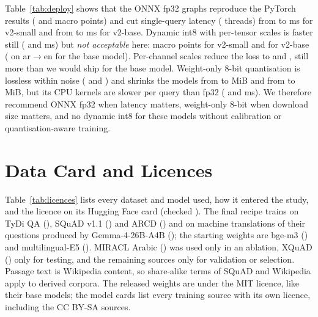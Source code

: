 \documentclass[11pt]{article}
\newcommand{\tabfont}{\footnotesize\setlength{\tabcolsep}{3.2pt}}
\newcommand{\ardir}{ar$\to$en}
\begin{document}
Table~\ref{tab:deploy} shows that the ONNX fp32 graphs reproduce the PyTorch results (\NumDeltaOnnxSmall{} and \NumDeltaOnnxBase{} macro points) and cut single-query latency (\NumThreadsLow{} threads) from \NumQLatSmallTorch{} to \NumQLatSmallOnnx{} ms for v2-small and from \NumQLatBaseTorch{} to \NumQLatBaseOnnx{} ms for v2-base.
Dynamic int8 with per-tensor scales is faster still (\NumQLatSmallDyn{} and \NumQLatBaseDyn{} ms) but \emph{not acceptable} here: \NumDeltaDynSmall{} macro points for v2-small and \NumDeltaDynBase{} for v2-base (\NumDeltaDynBaseArEn{} on \ardir{} for the base model).
Per-channel scales reduce the loss to \NumDeltaPcSmall{} and \NumDeltaPcBase{}, still more than we would ship for the base model.
Weight-only 8-bit quantisation is lossless within noise (\NumDeltaWoSmall{} and \NumDeltaWoBase{}) and shrinks the models from \NumSizeSmallOnnx{} to \NumSizeSmallWo{} MiB and from \NumSizeBaseOnnx{} to \NumSizeBaseWo{} MiB, but its CPU kernels are slower per query than fp32 (\NumQLatSmallWo{} and \NumQLatBaseWo{} ms).
We therefore recommend ONNX fp32 when latency matters, weight-only 8-bit when download size matters, and no dynamic int8 for these models without calibration or quantisation-aware training.

\begin{table}[t]
\centering\tabfont

\caption{CPU deployment variants of the final v2-small and v2-base. MiB: size on disk; RSS: peak resident memory of the benchmark process (\NumThreadsHigh{} threads; includes the python and data-loading baseline of that process); q@1: p50 latency of a single query (\NumThreadsLow{} threads, ms); p/s: passages per second (batch 32, \NumThreadsHigh{} threads); MRR: test macro MRR@10 $\times100$; $\Delta$: difference to PyTorch fp32 in points (macro, and \ardir{}).}\label{tab:deploy}
\end{table}

\section{Data Card and Licences}
Table~\ref{tab:licences} lists every dataset and model used, how it entered the study, and the licence on its Hugging Face card (checked \NumLicChecked).
The final recipe trains on TyDi QA (\LicTydi), SQuAD v1.1 (\LicSquad) and ARCD (\LicArcd) and on machine translations of their questions produced by Gemma-4-26B-A4B (\LicGemma); the starting weights are bge-m3 (\LicBge) and multilingual-E5 (\LicEBase).
MIRACL Arabic (\LicMiracl) was used only in an ablation, XQuAD (\LicXquad) only for testing, and the remaining sources only for validation or selection.
Passage text is Wikipedia content, so share-alike terms of SQuAD and Wikipedia apply to derived corpora.
The released weights are under the MIT licence, like their base models; the model cards list every training source with its own licence, including the CC BY-SA sources.
\end{document}
